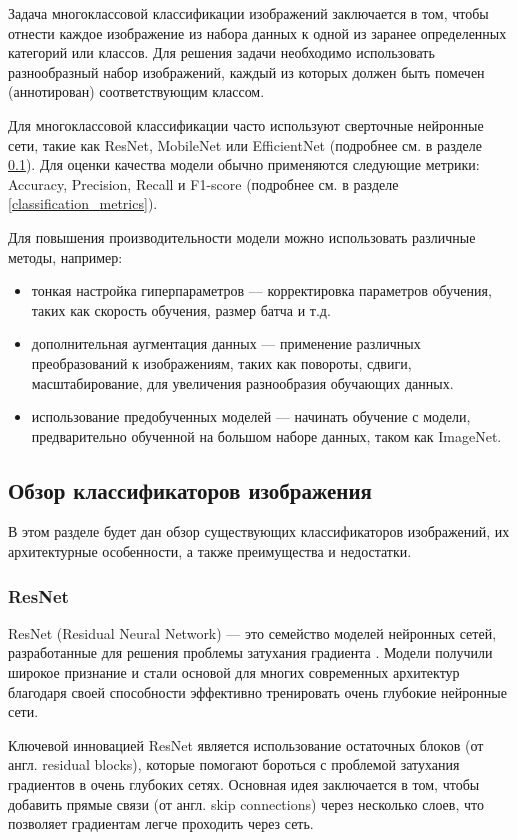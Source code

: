 \documentclass[a4paper,12pt]{extarticle}
\begin{document}
Задача многоклассовой классификации изображений заключается в том, чтобы отнести каждое изображение из набора данных к одной из заранее определенных категорий или классов. Для решения задачи необходимо использовать разнообразный набор изображений, каждый из которых должен быть помечен (аннотирован) соответствующим классом.

Для многоклассовой классификации часто используют сверточные нейронные сети, такие как ResNet, MobileNet или EfficientNet (подробнее см. в разделе \ref{classification_models}). Для оценки качества модели обычно применяются следующие метрики: Accuracy, Precision, Recall и F1-score (подробнее см. в разделе \ref{classification_metrics}).

Для повышения производительности модели можно использовать различные методы, например:
\begin{itemize}
	\item тонкая настройка гиперпараметров — корректировка параметров обучения, таких как скорость обучения, размер батча и т.д.
	\item дополнительная аугментация данных — применение различных преобразований к изображениям, таких как повороты, сдвиги, масштабирование, для увеличения разнообразия обучающих данных.
	\item использование предобученных моделей — начинать обучение с модели, предварительно обученной на большом наборе данных, таком как ImageNet.
\end{itemize}

\subsection{Обзор классификаторов изображения}\label{classification_models}

В этом разделе будет дан обзор существующих классификаторов изображений, их архитектурные особенности, а также преимущества и недостатки.
 
\subsubsection{ResNet}

ResNet (Residual Neural Network) — это семейство моделей нейронных сетей, разработанные для решения проблемы затухания градиента \cite{resnet}. Модели получили широкое признание и стали основой для многих современных архитектур благодаря своей способности эффективно тренировать очень глубокие нейронные сети.

Ключевой инновацией ResNet является использование остаточных блоков (от англ. residual blocks), которые помогают бороться с проблемой затухания градиентов в очень глубоких сетях. Основная идея заключается в том, чтобы добавить прямые связи (от англ. skip connections) через несколько слоев, что позволяет градиентам легче проходить через сеть.
\end{document}
